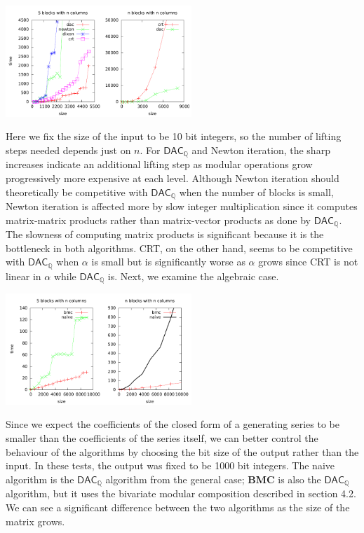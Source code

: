 \documentclass[sigconf]{acmart}
\newcommand{\Q}{\ensuremath{\mathbb{Q}}}
\newcommand{\DACQ}{\ensuremath{\mathsf{DAC}_\Q}}
\theoremstyle{acmdefinition}
\begin{document}
\includegraphics[width=7cm]{plots/compare-general.pdf}

Here we fix the size of the input to be 10 bit integers, so the
number of lifting steps needed depends just on $n$. For $\DACQ$ and
Newton iteration, the sharp increases indicate an additional lifting 
step as modular operations grow progressively more expensive at
each level. Although Newton iteration should theoretically be competitive with $\DACQ$ when the 
number of blocks is small, Newton iteration is affected more by slow integer multiplication since 
it computes matrix-matrix products rather than matrix-vector products as done by $\DACQ$. 
The slowness of computing matrix products is significant because it is the bottleneck in both algorithms. 
CRT, on the other hand, seems to be competitive with $\DACQ$ when $\alpha$ is small but is significantly worse as $\alpha$
grows since CRT is not linear in $\alpha$ while $\DACQ$ is. Next, we examine the algebraic case.

\includegraphics[width=7cm]{plots/compare-algebraic.pdf}

Since we expect the coefficients of the closed form of a generating series to be smaller
than the coefficients of the series itself, we can better control the behaviour of the algorithms
by choosing the bit size of the output rather than the input. In these tests, the output was fixed
to be 1000 bit integers.
The naive algorithm is the $\DACQ$ algorithm from the general case; 
\textbf{BMC} is also the $\DACQ$ algorithm, but it uses the bivariate 
modular composition described in section 4.2. We can see a significant difference 
between the two algorithms as the size of the matrix grows.

 {\tiny }
\end{document}
